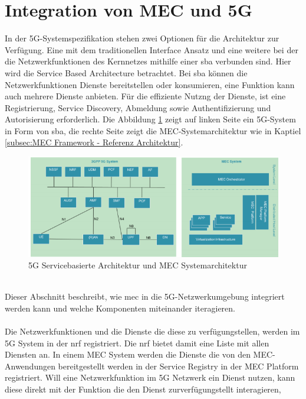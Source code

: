 \documentclass[runningheads]{llncs}
\numberwithin{figure}{section}
\begin{document}
\section{Integration von MEC und 5G}
In der 5G-Systemspezifikation stehen zwei Optionen für die Architektur zur Verfügung. 
Eine mit dem traditionellen Interface Ansatz und eine weitere 
bei der die Netzwerkfunktionen des Kernnetzes mithilfe einer \acrfull{sba} verbunden sind. 
Hier wird die Service Based Architecture betrachtet. Bei \acrshort{sba} können die Netzwerkfunktionen Dienste bereitstellen oder konsumieren, eine
Funktion kann auch mehrere Dienste anbieten. 
Für die effiziente Nutzng der Dienste, ist eine Registrierung, Service Discovery, Abmeldung sowie Authentifizierung und Autorisierung erforderlich.
Die Abbildung \ref{fig:sba} zeigt auf linken Seite ein 5G-System in Form von \acrshort{sba}, 
die rechte Seite zeigt die MEC-Systemarchitektur wie in Kaptiel \ref{subsec:MEC Framework - Referenz Architektur}.
\begin{figure}
  \includegraphics[width=\linewidth]{images/5GMEC-System-Architecture.png}
  \caption{5G Servicebasierte Architektur und MEC Systemarchitektur \cite{arnold5GRadioAccess2017} \cite{etsiETSIGSMEC}}
  \label{fig:sba}
\end{figure}
\\
Dieser Abschnitt beschreibt, wie \acrfull{mec} in die 5G-Netzwerkumgebung integriert werden kann 
und welche Komponenten miteinander iteragieren.
\\
\\
Die Netzwerkfunktionen und die Dienste die diese zu verfügungstellen, werden im 5G System in der \acrfull{nrf} registriert.
Die \acrshort{nrf} bietet damit eine Liste mit allen Diensten an. 
In einem MEC System werden die Dienste die von den MEC- Anwendungen bereitgestellt werden in der Service Registry in der MEC Platform registriert.
Will eine Netzwerkfunktion im 5G Netzwerk ein Dienst nutzen, kann diese direkt mit der Funktion die den Dienst zurverfügungstellt interagieren,
\end{document}
